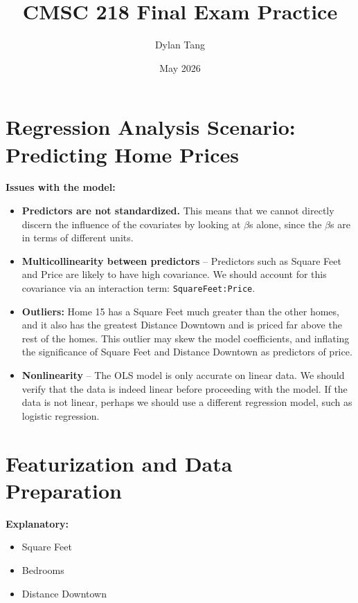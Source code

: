 \documentclass{article}
\title{CMSC 218 Final Exam Practice}
\author{Dylan Tang}
\date{May 2026}
\begin{document}
\maketitle

\section{Regression Analysis Scenario: Predicting Home Prices}

\textbf{Issues with the model:}

\begin{itemize}
    \item \textbf{Predictors are not standardized.} This means that we cannot directly discern the influence of the covariates by looking at $\beta$s alone, since the $\beta$s are in terms of different units.

    \item \textbf{Multicollinearity between predictors} -- Predictors such as Square Feet and Price are likely to have high covariance. We should account for this covariance via an interaction term: \texttt{SquareFeet:Price}.

    \item \textbf{Outliers:} Home 15 has a Square Feet much greater than the other homes, and it also has the greatest Distance Downtown and is priced far above the rest of the homes. This outlier may skew the model coefficients, and inflating the significance of Square Feet and Distance Downtown as predictors of price.

    \item \textbf{Nonlinearity} -- The OLS model is only accurate on linear data. We should verify that the data is indeed linear before proceeding with the model. If the data is not linear, perhaps we should use a different regression model, such as logistic regression.
\end{itemize}

\section{Featurization and Data Preparation}

\textbf{Explanatory:}
\begin{itemize}
    \item Square Feet
    \item Bedrooms
    \item Distance Downtown
\end{itemize}
\end{document}
